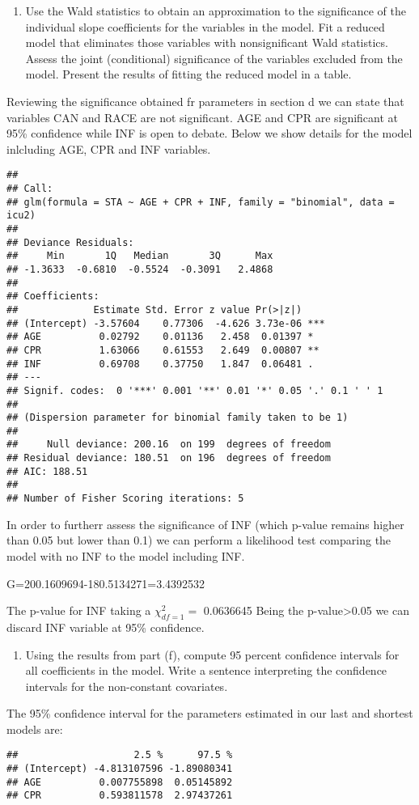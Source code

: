 \documentclass[]{article}
\begin{document}
\begin{enumerate}
\def\labelenumi{\alph{enumi}.}
\setcounter{enumi}{5}
\itemsep1pt\parskip0pt
\item
  Use the Wald statistics to obtain an approximation to the significance
  of the individual slope coefficients for the variables in the model.
  Fit a reduced model that eliminates those variables with
  nonsignificant Wald statistics. Assess the joint (conditional)
  significance of the variables excluded from the model. Present the
  results of fitting the reduced model in a table.
\end{enumerate}

Reviewing the significance obtained fr parameters in section d we can
state that variables CAN and RACE are not significant. AGE and CPR are
significant at 95\% confidence while INF is open to debate. Below we
show details for the model inlcluding AGE, CPR and INF variables.

\begin{verbatim}
## 
## Call:
## glm(formula = STA ~ AGE + CPR + INF, family = "binomial", data = icu2)
## 
## Deviance Residuals: 
##     Min       1Q   Median       3Q      Max  
## -1.3633  -0.6810  -0.5524  -0.3091   2.4868  
## 
## Coefficients:
##             Estimate Std. Error z value Pr(>|z|)    
## (Intercept) -3.57604    0.77306  -4.626 3.73e-06 ***
## AGE          0.02792    0.01136   2.458  0.01397 *  
## CPR          1.63066    0.61553   2.649  0.00807 ** 
## INF          0.69708    0.37750   1.847  0.06481 .  
## ---
## Signif. codes:  0 '***' 0.001 '**' 0.01 '*' 0.05 '.' 0.1 ' ' 1
## 
## (Dispersion parameter for binomial family taken to be 1)
## 
##     Null deviance: 200.16  on 199  degrees of freedom
## Residual deviance: 180.51  on 196  degrees of freedom
## AIC: 188.51
## 
## Number of Fisher Scoring iterations: 5
\end{verbatim}

In order to furtherr assess the significance of INF (which p-value
remains higher than 0.05 but lower than 0.1) we can perform a likelihood
test comparing the model with no INF to the model including INF.

G=200.1609694-180.5134271=3.4392532

The p-value for INF taking a $\chi^{2}_{df=1}=$ 0.0636645 Being the
p-value\textgreater{}0.05 we can discard INF variable at 95\%
confidence.

\begin{enumerate}
\def\labelenumi{\alph{enumi}.}
\setcounter{enumi}{6}
\itemsep1pt\parskip0pt
\item
  Using the results from part (f), compute 95 percent confidence
  intervals for all coefficients in the model. Write a sentence
  interpreting the confidence intervals for the non-constant covariates.
\end{enumerate}

The 95\% confidence interval for the parameters estimated in our last
and shortest models are:

\begin{verbatim}
##                    2.5 %      97.5 %
## (Intercept) -4.813107596 -1.89080341
## AGE          0.007755898  0.05145892
## CPR          0.593811578  2.97437261
\end{verbatim}
\end{document}
